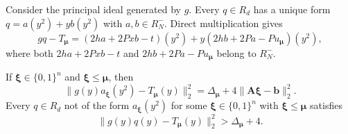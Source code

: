Consider the principal ideal generated by $g$.  Every \(q\in R_d\) has a unique form
\(q=a(y^2)+yb(y^2)\) with \(a,b\in R_N^-\).  Direct multiplication gives
\begin{equation}
\label{eq:block-product}
 gq-T_{\boldsymbol\mu}
 =(2ha+2Pxb-t)(y^2)+y(2hb+2Pa-Pu_{\boldsymbol\mu})(y^2),
\end{equation}
where both \(2ha+2Pxb-t\) and
\(2hb+2Pa-Pu_{\boldsymbol\mu}\) belong to \(R_N^-\).


\begin{lemma}
\label{lem:admissible}
If \(\boldsymbol\xi\in\{0,1\}^n\) and
\(\boldsymbol\xi\leq\boldsymbol\mu\), then
\begin{equation}
\label{eq:allowed-distance}
 \|g(y)a_{\boldsymbol\xi}(y^2)
       -T_{\boldsymbol\mu}(y)\|_2^2
 =\Delta_{\boldsymbol\mu}
  +4\|\mathbf A\boldsymbol\xi-\mathbf b\|_2^2.
\end{equation}
Every $q\in R_d$ not of the form \(a_{\boldsymbol\xi}(y^2)\) for some
\(\boldsymbol\xi\in\{0,1\}^n\) with
\(\boldsymbol\xi\leq\boldsymbol\mu\) satisfies
\[
 \|g(y)q(y)
       -T_{\boldsymbol\mu}(y)\|_2^2
 >\Delta_{\boldsymbol\mu}+4.
\]
\end{lemma}

